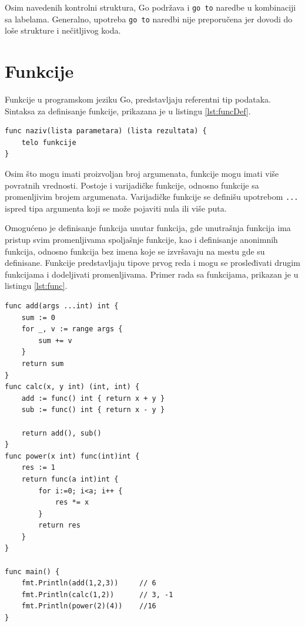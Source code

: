 \documentclass[12pt,oneside]{memoir}
\begin{document}
Osim navedenih kontrolni struktura, Go podržava i \texttt{go to} naredbe u kombinaciji sa labelama. Generalno, upotreba \texttt{go to} naredbi nije preporučena jer dovodi do loše strukture i nečitljivog koda.


\section{Funkcije} \label{func}

Funkcije u programskom jeziku Go, predstavljaju referentni tip podataka. Sintaksa za definisanje funkcije, prikazana je u listingu \ref{lst:funcDef}.

\begin{center}
\begin{lstlisting}[caption=Sintaksa za definisanje funkcije, label={lst:funcDef},  backgroundcolor=\color{background}]
func naziv(lista parametara) (lista rezultata) {
	telo funkcije 
} 
\end{lstlisting}
\end{center}

 Osim što mogu imati proizvoljan broj argumenata, funkcije mogu imati više povratnih vrednosti. Postoje i varijadičke funkcije, odnosno funkcije sa promenljivim brojem argumenata. Varijadičke funkcije se definišu upotrebom \texttt{...} ispred tipa argumenta koji se može pojaviti nula ili više puta. 

Omogućeno je definisanje funkcija unutar funkcija, gde unutrašnja funkcija ima pristup svim promenljivama spoljašnje funkcije, kao i  definisanje anonimnih funkcija, odnosno funkcija bez imena koje se izvršavaju na mestu gde su definisane. Funkcije predstavljaju tipove prvog reda i mogu se prosleđivati drugim funkcijama i dodeljivati promenljivama. Primer rada sa funkcijama, prikazan je u listingu \ref{lst:func}.

\begin{center}
\begin{lstlisting}[caption=Primer koji demonstrira rad sa funkcijama, label={lst:func},  backgroundcolor=\color{background}]
func add(args ...int) int {
	sum := 0
	for _, v := range args {
		sum += v
	}
	return sum
}
func calc(x, y int) (int, int) {
	add := func() int { return x + y }
	sub := func() int { return x - y }

	return add(), sub()
}	
func power(x int) func(int)int {
	res := 1
	return func(a int)int {
		for i:=0; i<a; i++ {
			res *= x
		}
		return res
	}
}

func main() {
	fmt.Println(add(1,2,3))		// 6
	fmt.Println(calc(1,2)) 		// 3, -1
	fmt.Println(power(2)(4))	//16
}
\end{lstlisting}
\end{center}
\end{document}
